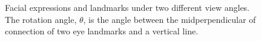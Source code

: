         \begin{figure}
            \centering
            \hspace{0.25cm}
            \caption{Facial expressions and landmarks under two different view angles. The rotation angle, $\theta$, is the angle between the midperpendicular of connection of two eye landmarks and a vertical line.}
            \label{fig:normalization}
        \end{figure}
        
